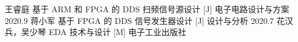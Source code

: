 
\setlength{\baselineskip}{18pt}

\begin{thebibliography}{99}  
    王睿庭 基于 ARM 和 FPGA 的 DDS 扫频信号源设计 [J] 电子电路设计与方案 2020.9  
    蒋小军 基于 FPGA 的 DDS 信号发生器设计 [J] 设计与分析 2020.7
    花汉兵，吴少琴 EDA 技术与设计 [M] 电子工业出版社
\end{thebibliography}

